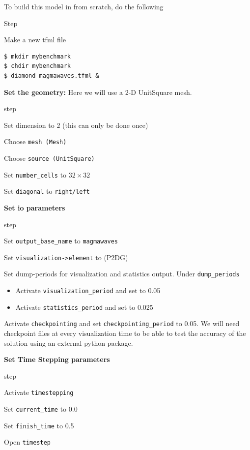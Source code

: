 To build this model in \TF{} from scratch, do the following
\begin{steps}{Step}
  \item Make a new tfml file
  \begin{lstlisting}[style=Bash]
$ mkdir mybenchmark
$ chdir mybenchmark
$ diamond magmawaves.tfml &
  \end{lstlisting}%
\item \textbf{Set the geometry:} Here we will use a 2-D UnitSquare mesh.
  \begin{steps}{step}
  \item Set dimension to 2 (this can only be done once)
  \item Choose \texttt{mesh (Mesh)} 
  \item Choose \texttt{source (UnitSquare)}
  \item Set \texttt{number\_cells} to $32\times32$
  \item Set \texttt{diagonal} to \texttt{right/left}
  \end{steps}
\item \textbf{Set io parameters}
  \begin{steps}{step}
  \item Set \texttt{output\_base\_name} to \texttt{magmawaves}
  \item Set \texttt{visualization->element} to (P2DG)
  \item Set dump-periods for visualization and statistics
    output.  Under \texttt{dump\_periods} 
    \begin{itemize}
    \item Activate \texttt{visualization\_period} and set to
      0.05
    \item Activate \texttt{statistics\_period} and set to
      0.025
  \end{itemize}
\item Activate \texttt{checkpointing} and set
  \texttt{checkpointing\_period} to 0.05.  We will need checkpoint
  files at every visualization time to be able to test the accuracy of
  the solution using an external python package.
  \end{steps}
\item \textbf{Set Time Stepping parameters}
  \begin{steps}{step}
  \item Activate \texttt{timestepping}
  \item Set \texttt{current\_time} to 0.0
  \item Set \texttt{finish\_time} to 0.5
  \item Open \texttt{timestep}

\end{steps}
\end{steps}
